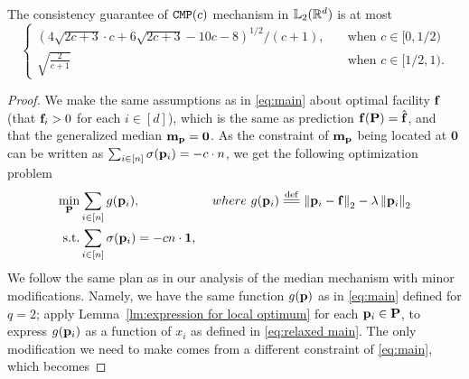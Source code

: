 \begin{theorem}
    \label{thm:consistency_guarantee}
    The consistency guarantee of $\CMP(c)$ mechanism in $\lqnorm[2](\R^d)$ is at most
    \[
    \begin{cases}
    \left( 4\sqrt{2c+3}\cdot c + 6\sqrt{2c+3} - 10c - 8 \right)^{1/2} / (c+1), & \quad\text{when }c \in [0, 1/2)\\
    \sqrt{\frac{2}{c+1}} & \quad\text{when }c \in [1/2, 1).
    \end{cases}
    \]
\end{theorem}
\begin{proof}
We make the same assumptions as in \eqref{eq:main} about optimal facility $\facility$ (that $\facility_i>0$ for each $i\in[d]$), which is the same as prediction $\facility(\locs)=\pred$, and that the generalized median $\cmp=\vect{0}$. As the constraint of $\cmp$ being located at $\mathbf{0}$ can be written as $\sum_{i\in[n]}\sigma(\loc_i)=-c\cdot n$, we get the following optimization problem
\begin{align}
 \label{eq:consistency main}
 \min\limits_{\locs}& \sum_{i\in[n]} g(\loci), &\ %
 where~ g(\loci)\eqdef\qnorm[2]{\loci-\facility}-\lambda\qnorm[2]{\loci} \nonumber\\
 \text{s.t.}&  \sum_{i\in [n]}\sigma(\loci) = -cn\cdot\vect{1}, & 
\end{align}
We follow the same plan as in our analysis of the median mechanism with minor modifications. Namely, we have the same function $g(\loc)$ as in \eqref{eq:main} defined for $q=2$; apply Lemma~\ref{lm:expression for local optimum} for each $\loci\in\locs$, to express $g(\loci)$ as a function of $x_i$ as defined in \eqref{eq:relaxed main}. 
The only modification we need to make comes from a different constraint of \eqref{eq:main}, which becomes

\end{proof}
